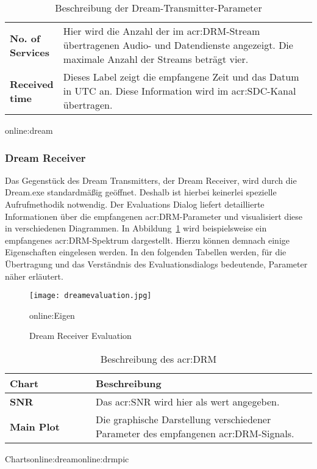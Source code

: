 \begin{table}[H]
\begin{center}
\begin{tabular}{p{0.17\linewidth}  p{0.83\linewidth}}
			\textbf{No. of Services} & Hier wird die Anzahl der im \gls{acr:DRM}-Stream übertragenen Audio- und Datendienste angezeigt. Die maximale Anzahl der Streams beträgt vier.\\
		
			\textbf{Received time} & Dieses Label zeigt die empfangene Zeit und das Datum in UTC an. Diese Information wird im \gls{acr:SDC}-Kanal übertragen.\\
			\bottomrule
		\end{tabular}
		\caption{Beschreibung der Dream-Transmitter-Parameter}\gls{online:dream}
		\label{tab:dreamparam}
	\end{center}
\end{table}

\newpage
\subsubsection{Dream Receiver}
\label{subsec:Unterabschnitt12}

Das Gegenstück des Dream Transmitters, der Dream Receiver, wird durch die Dream.exe standardmäßig geöffnet. Deshalb ist hierbei keinerlei spezielle Aufrufmethodik notwendig. Der Evaluations Dialog liefert detaillierte Informationen über die empfangenen \gls{acr:DRM}-Parameter und visualisiert diese in verschiedenen Diagrammen. In Abbildung~\ref{fig:dreamevaluation} wird beispielsweise ein empfangenes \gls{acr:DRM}-Spektrum dargestellt. Hierzu können demnach einige Eigenschaften eingelesen werden. In den folgenden Tabellen werden, für die Übertragung und das Verständnis des Evaluationsdialogs bedeutende, Parameter näher erläutert.


\begin{figure}[H]
	\centering
	\texttt{[image: dreamevaluation.jpg]}
	\caption[Dream Receiver Evaluation]{Dream Receiver Evaluation}\gls{online:Eigen}
	\label{fig:dreamevaluation}
\end{figure}



\begin{table}[ht]
	\begin{center}
		\begin{tabular}{p{0.28\linewidth}  p{0.72\linewidth}}
			\toprule
			\textbf{Chart} & \textbf{Beschreibung} \\
			\midrule
			\textbf{SNR} & Das \gls{acr:SNR} wird hier als wert angegeben.\\
			\textbf{Main Plot} & Die graphische Darstellung verschiedener Parameter des empfangenen \gls{acr:DRM}-Signals. \\
			\bottomrule
		\end{tabular}
		\caption{Beschreibung des \gls{acr:DRM}}Charts\gls{online:dream}\gls{online:drmpic}
		\label{tab:drmchart}
	\end{center}
\end{table}


